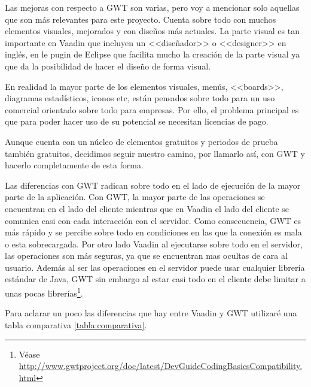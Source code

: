 Las mejoras con respecto a GWT son varias, pero voy a mencionar solo aquellas que son más relevantes para este proyecto. Cuenta sobre todo con muchos elementos visuales, mejorados y con diseños más actuales. La parte visual es tan importante en Vaadin que incluyen un <<diseñador>> o <<designer>> en inglés, en le pugin de Eclipse que facilita mucho la creación de la parte visual ya que da la posibilidad de hacer el diseño de forma visual.

En realidad la mayor parte de los elementos visuales, menús, <<boards>>, diagramas estadísticos, iconos etc, están pensados sobre todo para un uso comercial orientado sobre todo para empresas. Por ello, el problema principal es que para poder hacer uso de su potencial se necesitan licencias de pago.

Aunque cuenta con un núcleo de elementos gratuitos y periodos de prueba también gratuitos, decidimos seguir nuestro camino, por llamarlo así, con GWT y hacerlo completamente de esta forma.

Las diferencias con GWT radican sobre todo en el lado de ejecución de la mayor parte de la aplicación. Con GWT, la mayor parte de las operaciones se encuentran en el lado del cliente mientras que en Vaadin el lado del cliente se comunica casi con cada interacción con el servidor. Como consecuencia, GWT es más rápido y se percibe sobre todo en condiciones en las que la conexión es mala o esta sobrecargada. Por otro lado Vaadin al ejecutarse sobre todo en el servidor, las operaciones son más seguras, ya que se encuentran mas ocultas de cara al usuario. Además al ser las operaciones en el servidor puede usar cualquier librería estándar de Java, GWT sin embargo al estar casi todo en el cliente debe limitar a unas pocas librerías\footnote{Véase \url{http://www.gwtproject.org/doc/latest/DevGuideCodingBasicsCompatibility.html}}.

Para aclarar un poco las diferencias que hay entre Vaadin y GWT utilizaré una tabla comparativa \ref{tabla:comparativa}.


